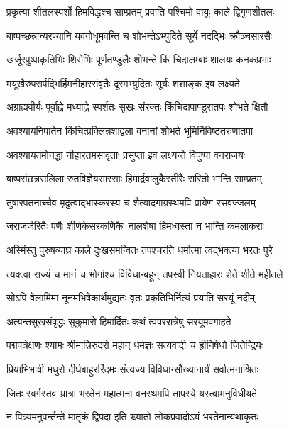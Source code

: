 \twolineshloka
{प्रकृत्या शीतलस्पर्शो हिमविद्धश्च साम्प्रतम्}
{प्रवाति पश्चिमो वायुः काले द्विगुणशीतलः} %

\twolineshloka
{बाष्पच्छन्नान्यरण्यानि यवगोधूमवन्ति च}
{शोभन्तेऽभ्युदिते सूर्ये नदद्भिः क्रौञ्चसारसैः} %

\twolineshloka
{खर्जूरपुष्पाकृतिभिः शिरोभिः पूर्णतण्डुलैः}
{शोभन्ते किं चिदालम्बाः शालयः कनकप्रभाः} %

\twolineshloka
{मयूखैरुपसर्पद्भिर्हिमनीहारसंवृतैः}
{दूरमभ्युदितः सूर्यः शशाङ्क इव लक्ष्यते} %

\twolineshloka
{अग्राह्यवीर्यः पूर्वाह्णे मध्याह्ने स्पर्शतः सुखः}
{संरक्तः किंचिदापाण्डुरातपः शोभते क्षितौ} %

\twolineshloka
{अवश्यायनिपातेन किंचित्प्रक्लिन्नशाद्वला}
{वनानां शोभते भूमिर्निविष्टतरुणातपा} %

\twolineshloka
{अवश्यायतमोनद्धा नीहारतमसावृताः}
{प्रसुप्ता इव लक्ष्यन्ते विपुष्पा वनराजयः} %

\twolineshloka
{बाष्पसंछन्नसलिला रुतविज्ञेयसारसाः}
{हिमार्द्रवालुकैस्तीरैः सरितो भान्ति साम्प्रतम्} %

\twolineshloka
{तुषारपतनाच्चैव मृदुत्वाद्भास्करस्य च}
{शैत्यादगाग्रस्थमपि प्रायेण रसवज्जलम्} %

\twolineshloka
{जराजर्जरितैः पर्णैः शीर्णकेसरकर्णिकैः}
{नालशेषा हिमध्वस्ता न भान्ति कमलाकराः} %

\twolineshloka
{अस्मिंस्तु पुरुषव्याघ्र काले दुःखसमन्वितः}
{तपश्चरति धर्मात्मा त्वद्भक्त्या भरतः पुरे} %

\twolineshloka
{त्यक्त्वा राज्यं च मानं च भोगांश्च विविधान्बहून्}
{तपस्वी नियताहारः शेते शीते महीतले} %

\twolineshloka
{सोऽपि वेलामिमां नूनमभिषेकार्थमुद्यतः}
{वृतः प्रकृतिभिर्नित्यं प्रयाति सरयूं नदीम्} %

\twolineshloka
{अत्यन्तसुखसंवृद्धः सुकुमारो हिमार्दितः}
{कथं त्वपररात्रेषु सरयूमवगाहते} %

\twolineshloka
{पद्मपत्रेक्षणः श्यामः श्रीमान्निरुदरो महान्}
{धर्मज्ञः सत्यवादी च ह्रीनिषेधो जितेन्द्रियः} %

\twolineshloka
{प्रियाभिभाषी मधुरो दीर्घबाहुररिंदमः}
{संत्यज्य विविधान्सौख्यानार्यं सर्वात्मनाश्रितः} %

\twolineshloka
{जितः स्वर्गस्तव भ्रात्रा भरतेन महात्मना}
{वनस्थमपि तापस्ये यस्त्वामनुविधीयते} %

\twolineshloka
{न पित्र्यमनुवर्न्तन्ते मातृकं द्विपदा इति}
{ख्यातो लोकप्रवादोऽयं भरतेनान्यथाकृतः} %

